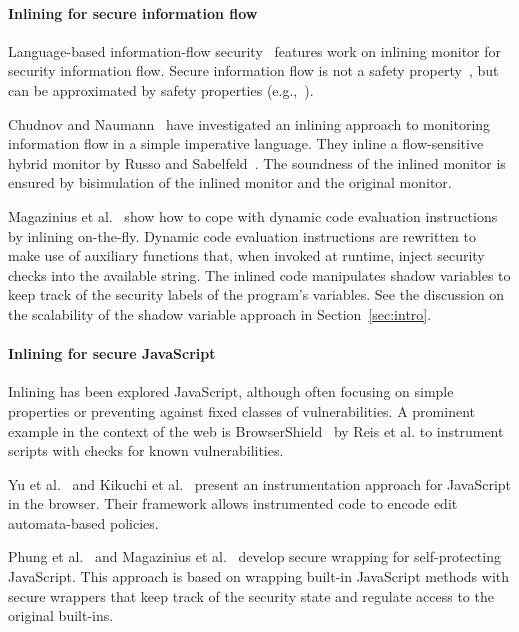 \documentclass{llncs}
\begin{document}
\paragraph{Inlining for secure information flow}
Language-based information-flow security~\cite{Sabelfeld:Myers:JSAC}
features work on inlining monitor for security information flow.
Secure information flow is not
a safety property~\cite{McLean:SSP94}, but can be approximated by
safety properties
(e.g.,~\cite{Boudol:FAST08,Sabelfeld:Russo:PSI09,Austin:Flanagan:PLAS09}).

Chudnov and
Naumann~\cite{Chudnov:Naumann:CSF10} have investigated an inlining
approach to monitoring information flow in a simple imperative language. They inline a flow-sensitive
hybrid monitor by Russo and
Sabelfeld~\cite{Russo:Sabelfeld:CSF10}. The soundness of the inlined
monitor is ensured by bisimulation of the inlined monitor and the
original monitor.

Magazinius et
al.~\cite{Magazinius+:SEC10,DBLP:journals/compsec/MagaziniusRS12} show
how to cope with dynamic code evaluation instructions by inlining
on-the-fly. 
Dynamic code evaluation instructions are
rewritten to make use of auxiliary functions that, when invoked at
runtime, inject security checks into the available string. 
The inlined code manipulates shadow variables to keep track of the
security labels of the program's variables.
See the discussion on the scalability of the shadow variable approach
in Section~\ref{sec:intro}.


\paragraph{Inlining for secure JavaScript}
Inlining has been explored JavaScript, although often focusing on
simple properties or preventing against fixed classes of vulnerabilities.
A prominent example in the context of the web is
BrowserShield~\cite{Reis+:TWeb07} by Reis et al. to instrument scripts with
checks for known vulnerabilities.

Yu et al.~\cite{Yu+:POPL07} and Kikuchi et
al.~\cite{DBLP:conf/aplas/2008} present an instrumentation approach
for JavaScript in the browser. Their framework allows instrumented
code to encode edit automata-based policies.

Phung et al.~\cite{DBLP:conf/ccs/PhungSC09} and 
Magazinius et al.~\cite{DBLP:conf/nordsec/MagaziniusPS10} develop
secure wrapping for self-protecting JavaScript. This approach is based
on wrapping built-in JavaScript methods with secure wrappers that
keep track of the security state and regulate access to the original built-ins.  
\end{document}
